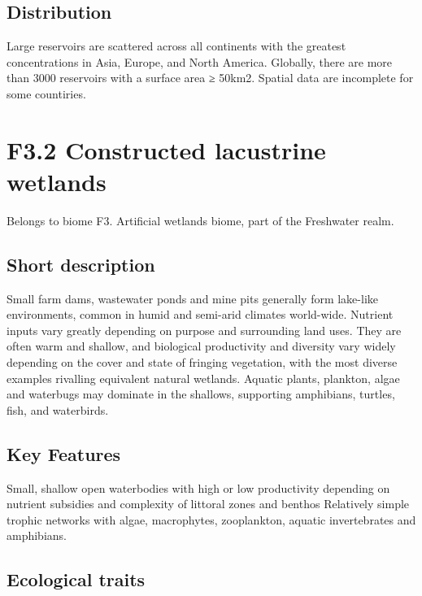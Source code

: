 \documentclass[
  letterpaper,
  DIV=11,
  numbers=noendperiod]{scrartcl}
\begin{document}
\subsection{Distribution}\label{distribution-126}

Large reservoirs are scattered across all continents with the greatest
concentrations in Asia, Europe, and North America. Globally, there are
more than 3000 reservoirs with a surface area ≥ 50km2. Spatial data are
incomplete for some countiries.

\section{F3.2 Constructed lacustrine
wetlands}\label{f3.2-constructed-lacustrine-wetlands-1}

Belongs to biome F3. Artificial wetlands biome, part of the Freshwater
realm.

\subsection{Short description}\label{short-description-127}

Small farm dams, wastewater ponds and mine pits generally form lake-like
environments, common in humid and semi-arid climates world-wide.
Nutrient inputs vary greatly depending on purpose and surrounding land
uses. They are often warm and shallow, and biological productivity and
diversity vary widely depending on the cover and state of fringing
vegetation, with the most diverse examples rivalling equivalent natural
wetlands. Aquatic plants, plankton, algae and waterbugs may dominate in
the shallows, supporting amphibians, turtles, fish, and waterbirds.

\subsection{Key Features}\label{key-features-127}

Small, shallow open waterbodies with high or low productivity depending
on nutrient subsidies and complexity of littoral zones and benthos
Relatively simple trophic networks with algae, macrophytes, zooplankton,
aquatic invertebrates and amphibians.

\subsection{Ecological traits}\label{ecological-traits-127}
\end{document}
